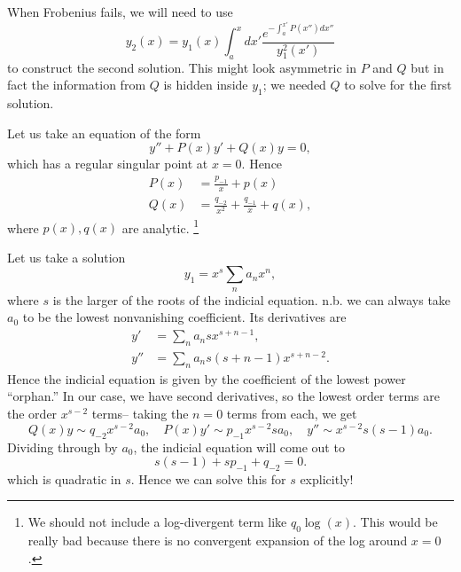When Frobenius fails, we will need to use
\begin{equation}
    y_2(x) = y_1(x) \int_a^x dx' \frac{e^{-\int_a^{x'} P(x'')dx''}}{y_1^2(x')}
\end{equation}
to construct the second solution. This might look asymmetric in $P$ and $Q$ but in fact the information from $Q$ is hidden inside $y_1$; we needed $Q$ to solve for the first solution.

Let us take an equation of the form
\begin{equation}
    y''+P(x) y' + Q(x) y =0,
\end{equation}
which has a regular singular point at $x=0$. Hence
\begin{align}
    P(x) &= \frac{p_{-1}}{x} + p(x)\\
    Q(x) &= \frac{q_{-2}}{x^2} + \frac{q_{-1}}{x} + q(x),
\end{align}
where $p(x),q(x)$ are analytic.%
    \footnote{We should not include a log-divergent term like $q_0 \log(x)$. This would be really bad because there is no convergent expansion of the log around $x=0$.}

Let us take a solution
\begin{equation}
    y_1 = x^s \sum_n a_n x^n,
\end{equation}
where $s$ is the larger of the roots of the indicial equation. n.b. we can always take $a_0$ to be the lowest nonvanishing coefficient. Its derivatives are
\begin{align}
    y' &= \sum_n a_n s x^{s+n-1},\\
    y'' &= \sum_n a_n s(s+n-1) x^{s+n-2}.
\end{align}
Hence the indicial equation is given by the coefficient of the lowest power ``orphan.'' In our case, we have second derivatives, so the lowest order terms are the order $x^{s-2}$ terms-- taking the $n=0$ terms from each, we get
\begin{equation}
    Q(x) y \sim q_{-2} x^{s-2} a_0,\quad P(x) y' \sim p_{-1} x^{s-2} s a_0, \quad y'' \sim x^{s-2}s (s-1) a_0.
\end{equation}
Dividing through by $a_0$, the indicial equation will come out to
\begin{equation}\label{indicialgeneric}
    s(s-1) + s p_{-1} + q_{-2} =0.
\end{equation}
which is quadratic in $s$. Hence we can solve this for $s$ explicitly!

